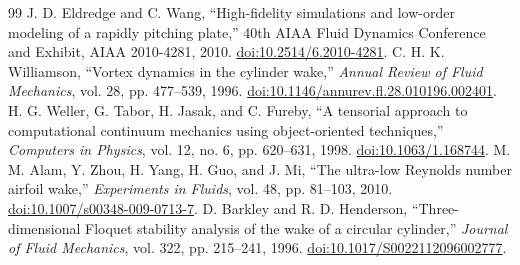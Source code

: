 \begin{thebibliography}{99}
 J. D. Eldredge and C. Wang, ``High-fidelity simulations and low-order modeling of a rapidly pitching plate,'' 40th AIAA Fluid Dynamics Conference and Exhibit, AIAA 2010-4281, 2010. \href{https://doi.org/10.2514/6.2010-4281}{doi:10.2514/6.2010-4281}.
 C. H. K. Williamson, ``Vortex dynamics in the cylinder wake,'' \emph{Annual Review of Fluid Mechanics}, vol. 28, pp. 477--539, 1996. \href{https://doi.org/10.1146/annurev.fl.28.010196.002401}{doi:10.1146/annurev.fl.28.010196.002401}.
 H. G. Weller, G. Tabor, H. Jasak, and C. Fureby, ``A tensorial approach to computational continuum mechanics using object-oriented techniques,'' \emph{Computers in Physics}, vol. 12, no. 6, pp. 620--631, 1998. \href{https://doi.org/10.1063/1.168744}{doi:10.1063/1.168744}.
 M. M. Alam, Y. Zhou, H. Yang, H. Guo, and J. Mi, ``The ultra-low Reynolds number airfoil wake,'' \emph{Experiments in Fluids}, vol. 48, pp. 81--103, 2010. \href{https://doi.org/10.1007/s00348-009-0713-7}{doi:10.1007/s00348-009-0713-7}.
 D. Barkley and R. D. Henderson, ``Three-dimensional Floquet stability analysis of the wake of a circular cylinder,'' \emph{Journal of Fluid Mechanics}, vol. 322, pp. 215--241, 1996. \href{https://doi.org/10.1017/S0022112096002777}{doi:10.1017/S0022112096002777}.
\end{thebibliography}
